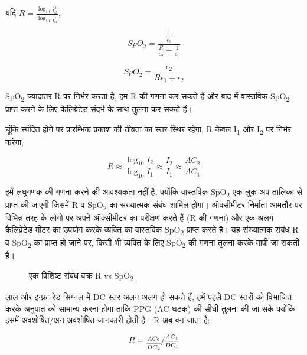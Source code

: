	यदि $R = \frac{\log_{10}\frac{I_2}{I_{o2}}}{\log_{10}\frac{I_1}{I_{o1}}}$,
	
	\[	
	SpO_2 = \frac{\frac{1}{\epsilon_1}}{\frac{R}{\epsilon_2} + \frac{1}{\epsilon_1}}
	\]	
	
	\begin{equation}
		SpO_2 = \frac{\epsilon_2}{R\epsilon_1 + \epsilon_2}
	\end{equation}	
	
	
	SpO\textsubscript{2} ज्यादातर R पर निर्भर करता है, हम R की गणना कर सकते हैं और बाद में वास्तविक SpO\textsubscript{2} प्राप्त करने के लिए कैलिब्रेटेड संदर्भ के साथ तुलना कर सकते हैं।
	
	चूंकि स्पंदित होने पर प्रारम्भिक प्रकाश की तीव्रता का स्तर स्थिर रहेगा, R केवल I\textsubscript{1} और I\textsubscript{2} पर निर्भर करेगा,
	
	\[
	R \approx \frac{\log_{10}{I_2}}{\log_{10}{I_1}} \approx \frac{I_2}{I_1} \approx \frac{AC_2}{AC_1}
	\]				
	
	हमें लघुगणक की गणना करने की आवश्यकता नहीं है, क्योंकि वास्तविक SpO\textsubscript{2} एक लुक अप तालिका से प्राप्त की जाएगी जिसमें R व SpO\textsubscript{2} का संख्यात्मक संबंध शामिल होगा। ऑक्सीमीटर निर्माता आमतौर पर विभिन्न तरह के लोगो पर अपने ऑक्सीमीटर का परीक्षण करते हैं (R की गणना) और एक अलग कैलिब्रेटेड मीटर का उपयोग करके व्यक्ति का वास्तविक SpO\textsubscript{2} प्राप्त करते है। यह संख्यात्मक संबंध R व SpO\textsubscript{2} का प्राप्त हो जाने पर, किसी भी व्यक्ति के लिए SpO\textsubscript{2} की गणना तुलना करके मापी जा सकती है।
	
	\begin{figure}[ht!]
	\centering	
	\caption{एक विशिष्ट संबंध वक्र R vs SpO\textsubscript{2}}
	\label{fig:curve}
	\end{figure}
	
	लाल और इन्फ़्रा-रेड सिग्नल में DC स्तर अलग-अलग हो सकते हैं, हमें पहले DC स्तरों को विभाजित करके अनुपात को सामान्य करना होगा ताकि PPG (AC घटक) की सीधी तुलना की जा सके क्योंकि इसमें अवशोषित/अन-अवशोषित जानकारी होती है। R अब बन जाता है:
	
	
	\[
		R = \sfrac{\frac{AC_2}{DC_2}}{{\frac{AC_1}{DC_1}}}
	\]	
	

